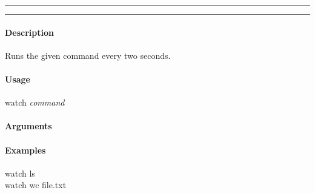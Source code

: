 \hrule
\vspace{1mm}
\hrule
\vspace{4mm}

\paragraph{Description}
\indentpar \raggedright \textrm{Runs the given command every two seconds.}\\

\paragraph{Usage}
\indentpar watch \textit{command}

\paragraph{Arguments}
\indentpar {}

\paragraph{Examples}

\indentpar watch ls\\
\indentpar watch wc file.txt

\vspace{20mm}